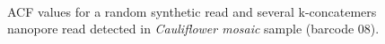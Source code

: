 \begin{figure}[!ht]
~

\caption{ACF values for a random synthetic read and several k-concatemers nanopore read detected in \emph{Cauliflower mosaic} sample (barcode 08).}
\label{supp_fig:concat_acf_dna}
\end{figure}

